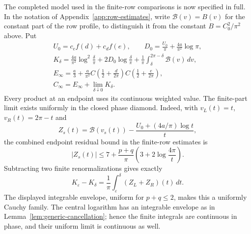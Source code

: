 The completed model used in the finite-row comparisons is now specified
in full.  In the notation of Appendix~\ref{app:row-estimates}, write
$\mathcal B(v)=B(v)$ for the constant part of the row profile, to
distinguish it from the constant $B=C_0^2/\pi^2$ above.  Put
\begin{equation}\label{scalar:finitepart-normalization}
 \begin{gathered}
 U_0=c_ef(d)+c_df(e),\qquad
 D_0=\frac{U_0}{\pi}+\frac{4a}{\pi^2}\log\pi,\\
 K_\delta=\frac{4a}{\pi^2}\log^2\frac\delta\pi
       +2D_0\log\frac\delta\pi
       +\frac1\pi\int_\delta^{2\pi-\delta}\mathcal B(v)\,dv,\\
 E_\infty=\frac a3+
  \frac{a}{\pi^2}C\left(\frac12+\frac d{2\pi}\right)
                       C\left(\frac12+\frac e{2\pi}\right),\\
 C_\infty=E_\infty+\lim_{\delta\downarrow0}K_\delta.
 \end{gathered}
\end{equation}
Every product at an endpoint uses its continuous weighted value.  The
finite-part limit exists uniformly in the closed phase diamond.  Indeed,
with $v_L(t)=t$, $v_R(t)=2\pi-t$ and
\[
 Z_s(t)=\mathcal B(v_s(t))-
                 \frac{U_0+(4a/\pi)\log t}{t},
\]
the combined endpoint residual bound in the finite-row estimates is
\[
 |Z_s(t)|\leq7+\frac{p+q}{\pi}
                       \left(3+2\log\frac{4\pi}{t}\right).
\]
Subtracting two finite renormalizations gives exactly
\[
 K_\varepsilon-K_\delta=
       \frac1\pi\int_\varepsilon^\delta(Z_L+Z_R)(t)\,dt.
\]
The displayed integrable envelope, uniform for $p+q\leq2$, makes this
a uniformly Cauchy family.  The central logarithm has an integrable
envelope as in Lemma~\ref{lem:generic-cancellation}; hence the finite
integrals are continuous in phase, and their uniform limit is
continuous as well.

